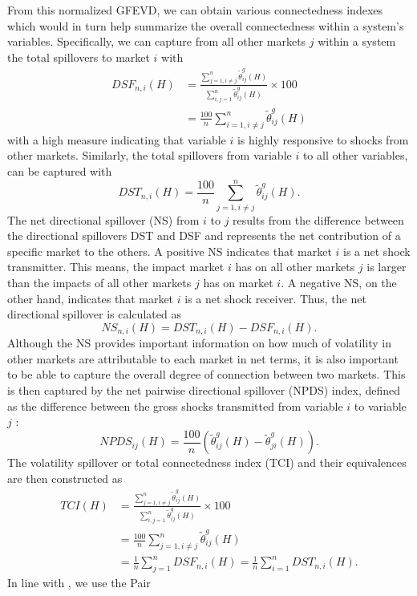 \documentclass[preprint, 3p,
authoryear]{elsarticle} %
\begin{document}
From this normalized GFEVD, we can obtain various connectedness indexes
which would in turn help summarize the overall connectedness within a
system's variables. Specifically, we can capture from all other markets
\(j\) within a system the total spillovers to market \(i\) with
\begin{align}
DSF_{n,i}(H) 
&= \frac{\displaystyle\sum_{j=1,i\neq j}^n\tilde{\theta}_{ij}^g(H)}{\displaystyle\sum_{i,j=1}^n\tilde{\theta}_{ij}^g(H)} \times 100 \\
&= \frac{100}{n}\sum_{i=1, i\neq j}^n\tilde{\theta}_{ij}^g(H)
\end{align} with a high measure indicating that variable \(i\) is highly
responsive to shocks from other markets. Similarly, the total spillovers
from variable \(i\) to all other variables, can be captured with
\begin{equation}
DST_{n,i}(H) = \frac{100}{n}\sum_{j=1,i \neq j}^n \tilde{\theta}_{ij}^g(H).
\end{equation} The net directional spillover (NS) from \(i\) to \(j\)
results from the difference between the directional spillovers DST and
DSF and represents the net contribution of a specific market to the
others. A positive NS indicates that market \(i\) is a net shock
transmitter. This means, the impact market \(i\) has on all other
markets \(j\) is larger than the impacts of all other markets \(j\) has
on market \(i\). A negative NS, on the other hand, indicates that market
\(i\) is a net shock receiver. Thus, the net directional spillover is
calculated as \begin{equation}
NS_{n,i}(H) = DST_{n,i}(H) - DSF_{n,i}(H).
\end{equation} Although the NS provides important information on how
much of volatility in other markets are attributable to each market in
net terms, it is also important to be able to capture the overall degree
of connection between two markets. This is then captured by the net
pairwise directional spillover (NPDS) index, defined as the difference
between the gross shocks transmitted from variable \(i\) to variable
\(j\) \citet{diebold_better_2012}: \begin{equation}
NPDS_{ij}(H)=\frac{100}{n}(\tilde{\theta}_{ij}^g(H) - \tilde{\theta}_{ji}^g(H)).
\end{equation} The volatility spillover or total connectedness index
(TCI) and their equivalences are then constructed as \begin{align}
TCI(H) 
&= \frac{\displaystyle\sum_{j=1, i\neq j}^n\tilde{\theta}_{ij}^g(H)}{\displaystyle\sum_{i,j=1}^n\tilde{\theta}_{ij}^g(H)} \times 100 \\
&= \frac{100}{n}\sum_{j=1, i \neq j}^n\tilde{\theta}_{ij}^g(H) \\
&= \frac{1}{n}\sum_{j=1}^nDSF_{n,i}(H) = \frac{1}{n}\sum_{i=1}^nDST_{n,i}(H). 
\end{align} In line with \citet{gabauer_dynamic_2021}, we use the Pair
\end{document}
